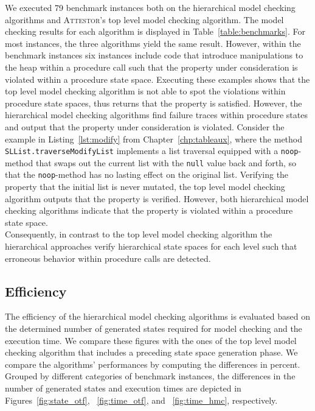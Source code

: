 \documentclass[a4paper, 12pt, twoside]{report}
\begin{document}
	We executed 79 benchmark instances both on the hierarchical model checking algorithms and \textsc{Attestor}'s top level model checking algorithm. The model checking results for each algorithm is displayed in Table~\ref{table:benchmarks}. For most instances, the three algorithms yield the same result. However, within the benchmark instances six instances include code that introduce manipulations to the heap within a procedure call such that the property under consideration is violated within a procedure state space. Executing these examples shows that the top level model checking algorithm is not able to spot the violations within procedure state spaces, thus returns that the property is satisfied. However, the hierarchical model checking algorithms find failure traces within procedure states and output that the property under consideration is violated. Consider the example in Listing~\ref{lst:modify} from Chapter~\ref{chp:tableaux},  where the method \texttt{SLList.traverseModifyList} implements a list traversal equipped with a \texttt{noop}-method that swaps out the current list with the \texttt{null} value back and forth, so that the \texttt{noop}-method has no lasting effect on the original list. Verifying the property that the initial list is never mutated, the top level model checking algorithm outputs that the property is verified. However, both hierarchical model checking algorithms indicate that the property is violated within a procedure state space.\\
		
	Consequently, in contrast to the top level model checking algorithm the hierarchical approaches verify hierarchical state spaces for each level such that erroneous behavior within procedure calls are detected.
	
	\subsection{Efficiency}

	The efficiency of the hierarchical model checking algorithms is evaluated based on the determined number of generated states required for model checking and the execution time. We compare these figures with the ones of the top level model checking algorithm that includes a preceding state space generation phase. We compare the algorithms' performances by computing the differences in percent. Grouped by different categories of benchmark instances, the differences in the number of generated states and execution times are depicted in Figures~\ref{fig:state_otf}, ~\ref{fig:time_otf}, and ~\ref{fig:time_hmc}, respectively.\\
	
\end{document}
